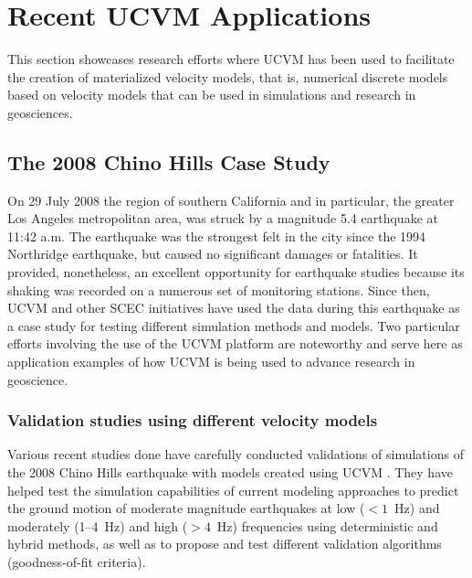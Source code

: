 
\section{Recent UCVM Applications}

This section showcases research efforts where UCVM has been used to facilitate the creation of materialized velocity models, that is, numerical discrete models based on velocity models that can be used in simulations and research in geosciences.

\subsection{The 2008 Chino Hills Case Study}

On 29 July 2008 the region of southern California and in particular, the greater Los Angeles metropolitan area, was struck by a magnitude  5.4 earthquake at 11:42 a.m. The earthquake was the strongest felt in the city since the 1994 Northridge earthquake, but caused no significant damages or fatalities. It provided, nonetheless, an excellent opportunity for earthquake studies because its shaking was recorded on a numerous set of monitoring stations. Since then, UCVM and other SCEC initiatives have used the data during this earthquake as a case study for testing different simulation methods and models. Two particular efforts involving the use of the UCVM platform are noteworthy and serve here as application examples of how UCVM is being used to advance research in geoscience.

\subsubsection{Validation studies using different velocity models}

Various recent studies done have carefully conducted validations of simulations of the 2008 Chino Hills earthquake with models created using UCVM \citep[e.g.,][]{Olsen_2010_SRL, Taborda_2013_BSSA, Taborda_2014_BSSA}. They have helped test the simulation capabilities of current modeling approaches to predict the ground motion of moderate magnitude earthquakes at low ($<1$~Hz) and moderately (1--4~Hz) and high ($>4$~Hz) frequencies using deterministic and hybrid methods, as well as to propose and test different validation algorithms (goodness-of-fit criteria). 

